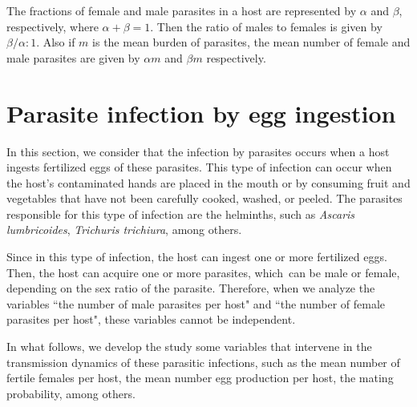 \documentclass[12pt,a4paper]{article}
\theoremstyle{plain}%
\theoremstyle{definition}
\theoremstyle{remark}
\begin{document}
	The fractions of female and male parasites in a host are represented  by $\alpha$ and $\beta$, respectively, where $\alpha+\beta=1$.
	Then the ratio of males to females is given by $\beta / \alpha : 1$. Also if $m$ is the mean burden of parasites, the mean number of
	female and male parasites are given by $\alpha m$ and $\beta m $ respectively.

	\section{Parasite infection by egg ingestion}
	
	\label{sec:probapareamiento}
	
	In this section, we consider that the infection by parasites occurs when a host ingests fertilized eggs of these parasites. This type of infection can occur when the host’s contaminated hands are placed in the mouth or by consuming fruit and vegetables that have not been carefully cooked, washed, or peeled. The parasites responsible for this type of infection are the helminths, such as \textit{Ascaris lumbricoides}, \textit{Trichuris trichiura}, among others.
	
	Since in this type of infection, the host can ingest one or more fertilized eggs. Then, the host can acquire one or more parasites, which can be male or female, depending on the sex ratio of the parasite. 
	Therefore, when we analyze the variables ``the number of male parasites per host" and ``the number of female parasites per host", these variables cannot be independent.
	
	
	In what follows, we develop the study some variables that intervene in the transmission dynamics of these parasitic infections, such as the mean number of fertile females per host, the mean number egg production per host, the mating probability, among others.
	
\end{document}
